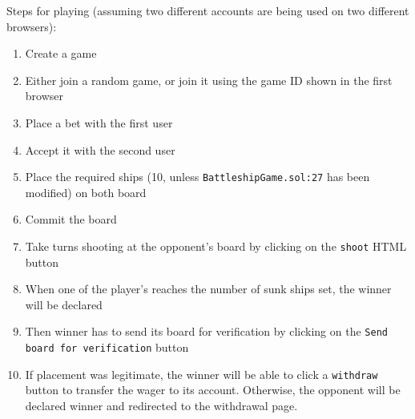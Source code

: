 Steps for playing (assuming two different accounts are being used on two
different browsers):
\begin{enumerate}
	\item Create a game
	\item Either join a random game, or join it using the game ID shown in the first
	      browser
	\item Place a bet with the first user
	\item Accept it with the second user
	\item Place the required ships (10, unless \texttt{BattleshipGame.sol:27}
	      has been modified) on both board
	\item Commit the board
	\item Take turns shooting at the opponent's board by clicking on the
	      \texttt{shoot} HTML button
	\item When one of the player's reaches the number of sunk ships set, the winner will
	      be declared
	\item Then winner has to send its board for verification by clicking on the
	      \texttt{Send board for verification} button
	\item If placement was legitimate, the winner will be able to click a
	      \texttt{withdraw} button to transfer the wager to its account.
	      Otherwise, the opponent will be declared winner and redirected to the
	      withdrawal page.
\end{enumerate}

